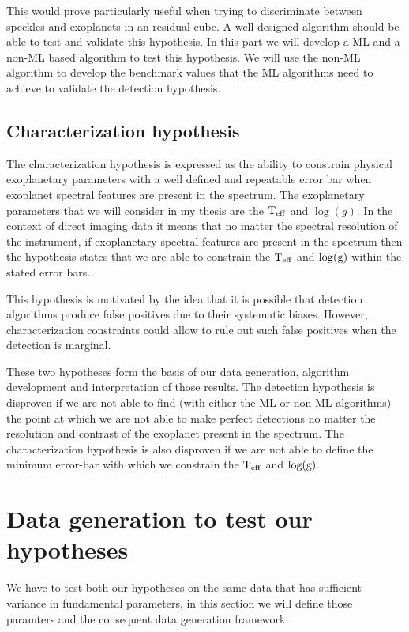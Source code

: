 This would prove particularly useful when trying to discriminate between speckles and exoplanets in an residual cube.
A well designed algorithm should be able to test and validate this hypothesis.
In this part we will develop a ML and a non-ML based algorithm to test this hypothesis.
We will use the non-ML algorithm to develop the benchmark values that the ML algorithms need to achieve to validate the detection hypothesis.

\subsection{Characterization hypothesis}
The characterization hypothesis is expressed as the ability to constrain physical exoplanetary parameters with a well defined and repeatable error bar when exoplanet spectral features are present in the spectrum.
The exoplanetary parameters that we will consider in my thesis are the $\rm{T_{eff}}$ and $\log(g)$.
In the context of direct imaging data it means that no matter the spectral resolution of the instrument, if exoplanetary spectral features are present in the spectrum then the hypothesis states that we are able to constrain the $\rm{T_{eff}}$ and $\log(\rm{g})$ within the stated error bars. 

This hypothesis is motivated by the idea that it is possible that detection algorithms produce false positives due to their systematic biases. 
However, characterization constraints could allow to rule out such false positives when the detection is marginal.

These two hypotheses form the basis of our data generation, algorithm development and interpretation of those results. 
The detection hypothesis is disproven if we are not able to find (with either the ML or non ML algorithms) the point at which we are not able to make perfect detections no matter the resolution and contrast of the exoplanet present in the spectrum.
The characterization hypothesis is also disproven if we are not able to define the minimum error-bar with which we constrain the $\rm{T_{eff}}$ and $\rm{\log(g)}$.

\section{Data generation to test our hypotheses}
We have to test both our hypotheses on the same data that has sufficient variance in fundamental parameters, in this section we will define those paramters and the consequent data generation framework.
